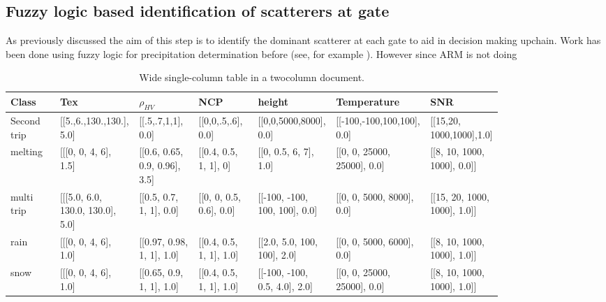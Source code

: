 \documentclass[twocol]{ametsoc}
\begin{document}
\subsection{Fuzzy logic based identification of scatterers at gate}
As previously discussed the aim of this step is to identify the dominant scatterer at each gate to aid in decision making 
upchain. Work has been done using fuzzy logic for precipitation determination before (see, for example
  \cite{gourley_fuzzy_2007}). However since ARM is not doing 



\begin{table}[ht]
\caption{Wide single-column table in a twocolumn document.}
\centering
\begin{tabular}{p{0.1\linewidth}p{0.12\linewidth}p{0.12\linewidth}p{0.12\linewidth}p{0.12\linewidth}p{0.12\linewidth}p{0.12\linewidth}}
\hline
Class & Tex& $\rho_{HV}$ &NCP & height & Temperature & SNR\\
\hline
Second trip & [[5.,6.,130.,130.], 5.0] & [[.5,.7,1,1], 0.0] & [[0,0,.5,.6], 0.0] & [[0,0,5000,8000], 0.0] & [[-100,-100,100,100], 0.0] & [[15,20, 1000,1000],1.0] \\
melting & [[[0, 0, 4, 6], 1.5]& [[0.6, 0.65, 0.9, 0.96], 3.5]& [[0.4, 0.5, 1, 1], 0]& [[0, 0.5, 6, 7], 1.0]& [[0, 0, 25000, 25000], 0.0]& [[8, 10, 1000, 1000], 0.0]] \\
multi trip & [[[5.0, 6.0, 130.0, 130.0], 5.0]& [[0.5, 0.7, 1, 1], 0.0]& [[0, 0, 0.5, 0.6], 0.0]& [[-100, -100, 100, 100], 0.0]& [[0, 0, 5000, 8000], 0.0]& [[15, 20, 1000, 1000], 1.0]]\\
rain & [[[0, 0, 4, 6], 1.0]& [[0.97, 0.98, 1, 1], 1.0]& [[0.4, 0.5, 1, 1], 1.0]& [[2.0, 5.0, 100, 100], 2.0]& [[0, 0, 5000, 6000], 0.0]& [[8, 10, 1000, 1000], 1.0]]\\
snow & [[[0, 0, 4, 6], 1.0]& [[0.65, 0.9, 1, 1], 1.0]& [[0.4, 0.5, 1, 1], 1.0]& [[-100, -100, 0.5, 4.0], 2.0]& [[0, 0, 25000, 25000], 0.0]& [[8, 10, 1000, 1000], 1.0]]\\
\hline
\end{tabular}
\end{table}


\end{document}
